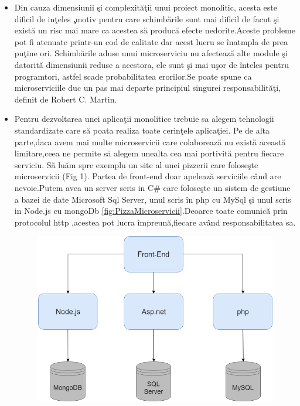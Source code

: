 \documentclass[a4paper,12pt]{report}
\begin{document}
\begin{itemize}
	\item Din cauza dimensiunii \c si complexit\u a\c tii unui proiect monolitic,
	      acesta este dificil de in\c teles \c ,motiv pentru care schimb\u arile sunt mai dificil de facut \c si exist\u a
	      un risc mai mare ca acestea s\u a produc\u a efecte nedorite.Aceste probleme pot fi atenuate printr-un
	      cod de calitate dar acest lucru se \^ inatmpla de prea pu\c tine ori. Schimb\u arile aduse unui microserviciu nu afecteaz\u a alte
	      module \c si datorit\u a dimensiunii reduse a acestora, ele sunt \c si mai u\c sor de \^inteles pentru programtori, astfel
	      scade probabilitatea erorilor.Se poate spune ca microserviciile duc un pas mai departe principiul singurei responsabilit\u a\c ti,
	      definit de Robert C. Martin.
	\item Pentru dezvoltarea unei aplica\c tii monolitice trebuie sa alegem tehnologii standardizate care s\u a poata
	      realiza toate cerin\c tele aplica\c tiei. Pe de alta parte,daca avem mai multe microservicii care colaboreaz\u a nu exist\u a
	      aceast\u a limitare,ceea ne permite s\u a alegem unealta cea mai portivit\u a pentru fiecare serviciu.
	      S\u a lu\u am spre exemplu un site al unei pizzerii care folose\c ste microservicii (Fig 1).
	      Partea de front-end doar apeleaz\u a serviciile c\^and are nevoie.Putem avea un server scris
	      in C\# care folose\c ste un sistem de gestiune a bazei de date Microsoft Sql Server,
	      unul scris \^in php cu MySql \c si unul scris in Node.js cu mongoDb \ref{fig:PizzaMicroservicii}.Deoarce toate comunic\u a prin
	      protocolul http ,acestea pot lucra \^impreun\u a,fiecare av\^and responsabilitatea sa.
	      \begin{figure}[!htb]
		      \includegraphics[width=\textwidth,keepaspectratio]{PizzaMicroservicii}

\end{figure}
\end{itemize}
\end{document}
